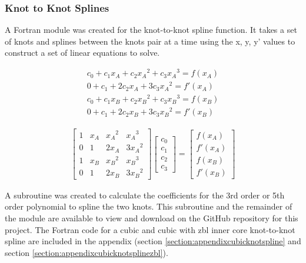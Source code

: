 \subsubsection{Knot to Knot Splines}

A Fortran module was created for the knot-to-knot spline function.  It takes a set of knots and splines between the knots pair at a time using the x, y, y' values to construct a set of linear equations to solve. 

\begin{equation}
  \begin{split}
    c_0 + c_1 x_A + c_2 {x_A}^2 + c_3 {x_A}^3 = f(x_A) \\
    0 + c_1 + 2 c_2 {x_A} + 3 c_3 {x_A}^2 = f'(x_A) \\
    c_0 + c_1 x_B + c_2 {x_B}^2 + c_3 {x_B}^3 = f(x_B) \\
    0 + c_1 + 2 c_2 {x_B} + 3 c_3 {x_B}^2 = f'(x_B) 
  \end{split}
  \label{eq:eqSplineThreeEquations}
\end{equation}


\begin{equation}
  \begin{split}
    \begin{bmatrix}
    1  &  x_A  &  {x_A}^2  &  {x_A}^3     \\
    0  &  1    &  2 x_A    &  3 {x_A}^2   \\
    1  &  x_B  &  {x_B}^2  &  {x_B}^3     \\
    0  &  1    &  2 x_B    &  3 {x_B}^2
    \end{bmatrix}
    \begin{bmatrix}
    c_0 \\
    c_1 \\ 
    c_2 \\ 
    c_3
    \end{bmatrix}
    = 
    \begin{bmatrix}
    f(x_A) \\
    f'(x_A) \\ 
    f(x_B) \\ 
    f'(x_B)
    \end{bmatrix}
  \end{split}
  \label{eq:eqSplineThreeMatrix}
\end{equation}


A subroutine was created to calculate the coefficients for the 3rd order or 5th order polynomial to spline the two knots.  This subroutine and the remainder of the module are available to view and download on the GitHub repository for this project.  The Fortran code for a cubic and cubic with \acrshort{zbl} inner core knot-to-knot spline are included in the appendix (section \ref{section:appendixcubicknotspline} and section \ref{section:appendixcubicknotsplinezbl}).





